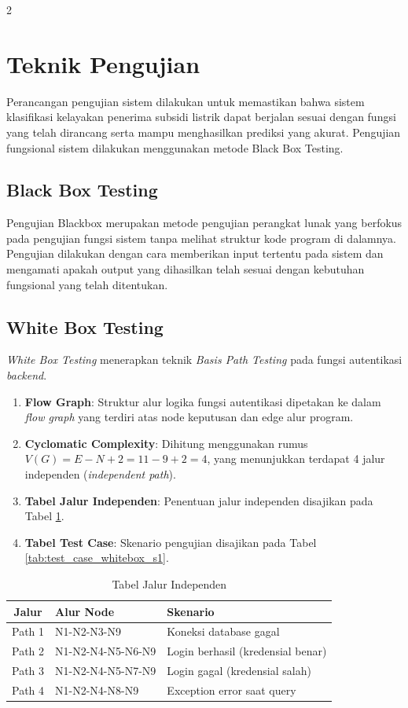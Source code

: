 \documentclass[12pt, a4paper, onecolumn, oneside]{report}
\begin{document}
\begin{spacing}{2}
\section{Teknik Pengujian}
Perancangan pengujian sistem dilakukan untuk memastikan bahwa sistem klasifikasi kelayakan penerima subsidi listrik dapat berjalan sesuai dengan fungsi yang telah dirancang serta mampu menghasilkan prediksi yang akurat. Pengujian fungsional sistem dilakukan menggunakan metode Black Box Testing.

\subsection{Black Box Testing}
Pengujian Blackbox merupakan metode pengujian perangkat lunak yang berfokus pada pengujian fungsi sistem tanpa melihat struktur kode program di dalamnya. Pengujian dilakukan dengan cara memberikan input tertentu pada sistem dan mengamati apakah output yang dihasilkan telah sesuai dengan kebutuhan fungsional yang telah ditentukan.

\subsection{White Box Testing}
\textit{White Box Testing} menerapkan teknik \textit{Basis Path Testing} pada fungsi autentikasi \textit{backend}.
\begin{enumerate}
    \item \textbf{Flow Graph}: Struktur alur logika fungsi autentikasi dipetakan ke dalam \textit{flow graph} yang terdiri atas node keputusan dan edge alur program.
    \item \textbf{Cyclomatic Complexity}: Dihitung menggunakan rumus $V(G) = E - N + 2 = 11 - 9 + 2 = 4$, yang menunjukkan terdapat 4 jalur independen (\textit{independent path}).
    \item \textbf{Tabel Jalur Independen}: Penentuan jalur independen disajikan pada Tabel \ref{tab:jalur_independen_s1}.
    \item \textbf{Tabel Test Case}: Skenario pengujian disajikan pada Tabel \ref{tab:test_case_whitebox_s1}.
\end{enumerate}

\begin{table}[H]
\centering
\caption{Tabel Jalur Independen}
\label{tab:jalur_independen_s1}
\begin{tabularx}{\textwidth}{|c|p{4cm}|X|}
\hline
\textbf{Jalur} & \textbf{Alur Node} & \textbf{Skenario} \\ \hline
Path 1 & N1-N2-N3-N9 & Koneksi database gagal \\ \hline
Path 2 & N1-N2-N4-N5-N6-N9 & Login berhasil (kredensial benar) \\ \hline
Path 3 & N1-N2-N4-N5-N7-N9 & Login gagal (kredensial salah) \\ \hline
Path 4 & N1-N2-N4-N8-N9 & Exception error saat query \\ \hline
\end{tabularx}
\end{table}


\end{spacing}
\end{document}
